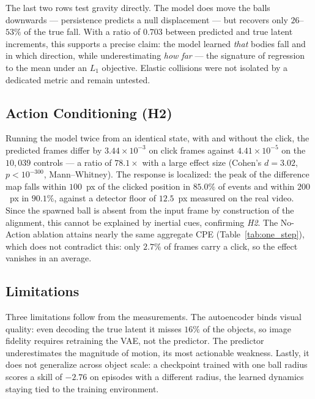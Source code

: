 \documentclass[conference]{IEEEtran}
\begin{document}
The last two rows test gravity directly. The model does move the balls downwards --- persistence predicts a null displacement --- but recovers only $26$--$53\%$ of the true fall. With a ratio of $0.703$ between predicted and true latent increments, this supports a precise claim: the model learned \emph{that} bodies fall and in which direction, while underestimating \emph{how far} --- the signature of regression to the mean under an $L_1$ objective. Elastic collisions were not isolated by a dedicated metric and remain untested.

\subsection{Action Conditioning (H2)}

Running the model twice from an identical state, with and without the click, the predicted frames differ by $3.44 \times 10^{-3}$ on click frames against $4.41 \times 10^{-5}$ on the $10{,}039$ controls --- a ratio of $78.1\times$ with a large effect size (Cohen's $d = 3.02$, $p < 10^{-300}$, Mann--Whitney). The response is localized: the peak of the difference map falls within $100$~px of the clicked position in $85.0\%$ of events and within $200$~px in $90.1\%$, against a detector floor of $12.5$~px measured on the real video. Since the spawned ball is absent from the input frame by construction of the alignment, this cannot be explained by inertial cues, confirming \textit{H2}. The No-Action ablation attains nearly the same aggregate CPE (Table~\ref{tab:one_step}), which does not contradict this: only $2.7\%$ of frames carry a click, so the effect vanishes in an average.

\subsection{Limitations}

Three limitations follow from the measurements. The autoencoder binds visual quality: even decoding the true latent it misses $16\%$ of the objects, so image fidelity requires retraining the VAE, not the predictor. The predictor underestimates the magnitude of motion, its most actionable weakness. Lastly, it does not generalize across object scale: a checkpoint trained with one ball radius scores a skill of $-2.76$ on episodes with a different radius, the learned dynamics staying tied to the training environment.





\vspace{12pt}
\end{document}
